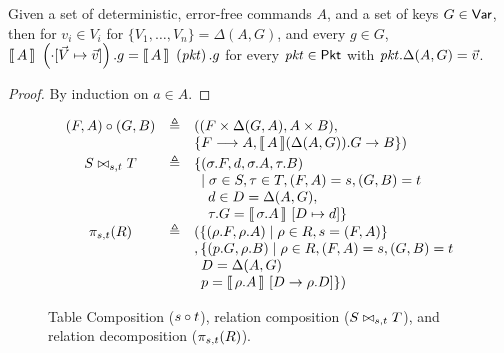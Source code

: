 \begin{proposition}
  Given a set of deterministic, error-free commands $A$, and a set of
  keys $G \in \Var$, then for $v_i \in V_i$ for
  $\{V_1, \ldots, V_n\} = \Delta(A,G)$, and every $g \in G$,
  $\bracbb{A}~\left(\cdot[\vec V \mapsto \vec v]\right).g =
  \bracbb{A}~\left(\pkt\right).g$ for every $\pkt \in \Pkt$ with
  $\pkt.\Delta(A,G) = \vec v$.
\end{proposition}

\begin{proof} By induction on $a \in A$.  
\end{proof}

\begin{figure}[tpb]
  \[\begin{array}{ccl}
      \compose{(F,A)}{(G,B)}
      & \triangleq
      & ((F\times\Delta(G,A), A\times B),\\
      &&\{F \longrightarrow A, \bracbb{A}(\Delta(A,G)).G \to B \})\\[.2em]
      \relcomp{s}{t}{S}{T}
      & \triangleq
      & \{(\sigma.F,d,\sigma.A,\tau.B) \\
      && \hspace{.5em}
         \mid \sigma \in S, \tau \in T, (F,A) = s, (G,B) = t \\
      && \hspace{1em}
         d \in D = \Delta(A, G),\\
      && \hspace{1em}
         \tau.G = \bracbb{\sigma.A}~[D \mapsto d]
         \}\\        
      \decomp s t R
      & \triangleq
      & (\{(\rho.F,\rho.A) \mid \rho \in R, s = (F,A)\} \\
      && , \{(p.G, \rho.B) \mid \rho \in R, (F,A) = s, (G,B) = t \\
      && \hspace{.5em}
         D = \Delta(A,G) \\
      && \hspace{.5em}
         p = \bracbb{\rho.A}~[D \to \rho.D] \} )
    \end{array}
  \]  
  \caption{Table Composition ($\compose{s}{t}$), relation
    composition ($\relcomp{s}{t}{S}{T}$), and relation
    decomposition ($\decomp{s}{t}{R}$).}
  \label{fig:compose-tables}
\end{figure}

